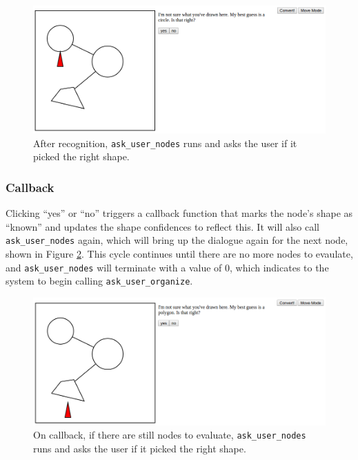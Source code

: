 \documentclass[12pt]{article}
\begin{document}
\begin{figure}
\includegraphics[width=\textwidth]{ask_user1.png}
\caption{After recognition, \texttt{ask\_user\_nodes} runs and asks the user if it picked the right shape.}
\label{ask_user1}
\end{figure}

\subsubsection{Callback}
\par Clicking ``yes'' or ``no'' triggers a callback function that marks the node's shape as ``known'' and updates the shape confidences to reflect this. It will also call \texttt{ask\_user\_nodes} again, which will bring up the dialogue again for the next node, shown in Figure \ref{ask_user3}. This cycle continues until there are no more nodes to evaulate, and \texttt{ask\_user\_nodes} will terminate with a value of 0, which indicates to the system to begin calling \texttt{ask\_user\_organize}.

\begin{figure}
\includegraphics[width=\textwidth]{ask_user3.png}
\caption{On callback, if there are still nodes to evaluate, \texttt{ask\_user\_nodes} runs and asks the user if it picked the right shape.}
\label{ask_user3}
\end{figure}
\end{document}
